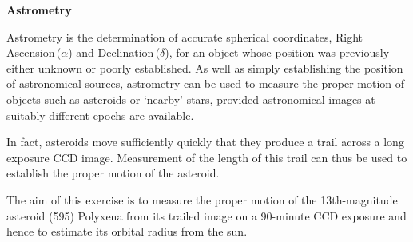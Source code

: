 \pagestyle{myheadings}
\renewcommand\baselinestretch{1.0}
\setcounter{page}{1}
\begin{center}
{\Huge \bf Astrometry}
\end{center}

Astrometry is the determination of accurate spherical coordinates, Right Ascension\,($\alpha$) and Declination\,($\delta$), for an object whose position was previously either unknown or poorly established. As well as simply establishing the position of astronomical sources, astrometry can be used to measure the proper motion of objects such as asteroids or `nearby' stars, provided astronomical images at suitably different  epochs are available. 

In fact, asteroids move sufficiently quickly that they produce a trail across a long exposure CCD image. Measurement of the length of this trail can thus be used to establish the proper motion of the asteroid.

The aim of this exercise is to measure the proper motion of the \setcounter{page}{1}13th-magnitude asteroid (595) Polyxena from its trailed image on a 90-minute CCD exposure and hence to estimate its orbital radius from the sun.

